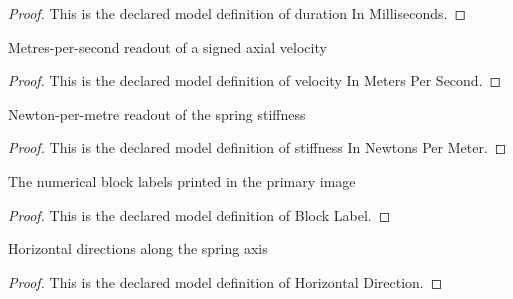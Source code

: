 \begin{proof}
  This is the declared model definition of duration In Milliseconds.
\end{proof}
\begin{definition}
  \label{def:physics:phyx-mini-0261:phyxminiproblems-problemphyxmini0261-velocityinmeterspersecond}
  Metres-per-second readout of a signed axial velocity
\end{definition}
\begin{proof}
  This is the declared model definition of velocity In Meters Per Second.
\end{proof}
\begin{definition}
  \label{def:physics:phyx-mini-0261:phyxminiproblems-problemphyxmini0261-stiffnessinnewtonspermeter}
  Newton-per-metre readout of the spring stiffness
\end{definition}
\begin{proof}
  This is the declared model definition of stiffness In Newtons Per Meter.
\end{proof}
\begin{definition}
  \label{def:physics:phyx-mini-0261:phyxminiproblems-problemphyxmini0261-blocklabel}
  The numerical block labels printed in the primary image
\end{definition}
\begin{proof}
  This is the declared model definition of Block Label.
\end{proof}
\begin{definition}
  \label{def:physics:phyx-mini-0261:phyxminiproblems-problemphyxmini0261-horizontaldirection}
  Horizontal directions along the spring axis
\end{definition}
\begin{proof}
  This is the declared model definition of Horizontal Direction.
\end{proof}
